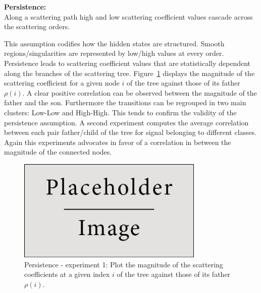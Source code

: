 \documentclass[a4paper,11pt]{report}
\begin{document}
		\begin{assumption}\textbf{Persistence:}\\
		  Along a scattering path high and low scattering coefficient values cascade across the scattering orders.\\
		  \label{assum:Persistence}
		\end{assumption}

		This assumption codifies how the hidden states are structured. Smooth regions/singularities are represented by low/high values at every order. Persistence leads to scattering coefficient values that are statistically dependent along the branches of the scattering tree. Figure~\ref{fig:Persistence - 1} displays the magnitude of the scattering coefficient for a given node $i$ of the tree against those of its father $\rho(i)$. A clear positive correlation can be observed between the magnitude of the father and the son. Furthermore the transitions can be regrouped in two main clusters: Low-Low and High-High. This tends to confirm the validity of the persistence assumption. A second experiment computes the average correlation between each pair father/child of the tree for signal belonging to different classes. Again this experiments advocates in favor of a correlation in between the magnitude of the connected nodes.  
		
		\begin{figure}
				\begin{center}
					\includegraphics[width=3.5in]{placeholder.jpg}
					\caption[Persistence - experiment 1.]{Persistence - experiment 1: Plot the magnitude of the scattering coefficients at a given index $i$ of the tree against those of its father $\rho(i)$.} %
					\label{fig:Persistence - 1}
				\end{center}
		\end{figure} 
		
\end{document}
